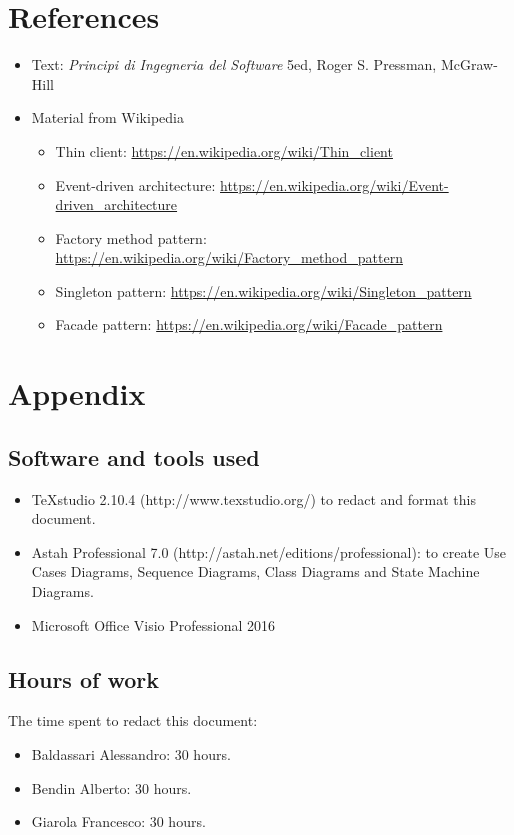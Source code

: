 \documentclass[a4paper,11pt]{report} %
\begin{document}
	\section{References}
	\begin{itemize}
		\item Text: \textit{Principi di Ingegneria del Software} 5ed, Roger S. Pressman, McGraw-Hill
		\item Material from Wikipedia
		\begin{itemize}
			\item Thin client: \href{https://en.wikipedia.org/wiki/Thin_client}{https://en.wikipedia.org/wiki/Thin\_client}
			\item Event-driven architecture: \href{https://en.wikipedia.org/wiki/Event-driven_architecture}{https://en.wikipedia.org/wiki/Event-driven\_architecture}
			\item Factory method pattern: \href{https://en.wikipedia.org/wiki/Factory_method_pattern}{https://en.wikipedia.org/wiki/Factory\_method\_pattern}
			\item Singleton pattern: \href{https://en.wikipedia.org/wiki/Singleton_pattern}{https://en.wikipedia.org/wiki/Singleton\_pattern}
			\item Facade pattern: \href{https://en.wikipedia.org/wiki/Facade_pattern}{https://en.wikipedia.org/wiki/Facade\_pattern}
			
		\end{itemize}
	\end{itemize}
	
	
	\section{Appendix}
	
	\subsection{Software and tools used}
	\begin{itemize}
		\item TeXstudio 2.10.4 (http://www.texstudio.org/) to redact and format this document.
		\item Astah Professional 7.0 (http://astah.net/editions/professional): to create Use
		Cases Diagrams, Sequence Diagrams, Class Diagrams and State Machine	Diagrams.
		\item Microsoft Office Visio Professional 2016
	\end{itemize}
	
	\subsection{Hours of work} The time spent to redact this document:
	\begin{itemize}
		\item Baldassari Alessandro: 30 hours.
		\item Bendin Alberto: 30 hours.
		\item Giarola Francesco: 30 hours.
	\end{itemize}
\end{document}
